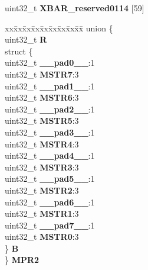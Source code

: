 \begin{DoxyCompactItemize}
\begin{tabbing}
\end{tabbing}\item 
\mbox{\label{structXBAR__tag_a2ee875f2d4710510c1febbe58144a440}} 
uint32\+\_\+t {\bfseries X\+B\+A\+R\+\_\+reserved0114} \mbox{[}59\mbox{]}
\item 
\mbox{\label{structXBAR__tag_ab6c554be08cf288c88717431a3e6d818}} 
\begin{tabbing}
xx\=xx\=xx\=xx\=xx\=xx\=xx\=xx\=xx\=\kill
union \{\\
\>uint32\_t {\bfseries R}\\
\>struct \{\\
\>\>uint32\_t {\bfseries \_\_pad0\_\_}:1\\
\>\>uint32\_t {\bfseries MSTR7}:3\\
\>\>uint32\_t {\bfseries \_\_pad1\_\_}:1\\
\>\>uint32\_t {\bfseries MSTR6}:3\\
\>\>uint32\_t {\bfseries \_\_pad2\_\_}:1\\
\>\>uint32\_t {\bfseries MSTR5}:3\\
\>\>uint32\_t {\bfseries \_\_pad3\_\_}:1\\
\>\>uint32\_t {\bfseries MSTR4}:3\\
\>\>uint32\_t {\bfseries \_\_pad4\_\_}:1\\
\>\>uint32\_t {\bfseries MSTR3}:3\\
\>\>uint32\_t {\bfseries \_\_pad5\_\_}:1\\
\>\>uint32\_t {\bfseries MSTR2}:3\\
\>\>uint32\_t {\bfseries \_\_pad6\_\_}:1\\
\>\>uint32\_t {\bfseries MSTR1}:3\\
\>\>uint32\_t {\bfseries \_\_pad7\_\_}:1\\
\>\>uint32\_t {\bfseries MSTR0}:3\\
\>\} {\bfseries B}\\
\} {\bfseries MPR2}\\


\end{tabbing}
\end{DoxyCompactItemize}
